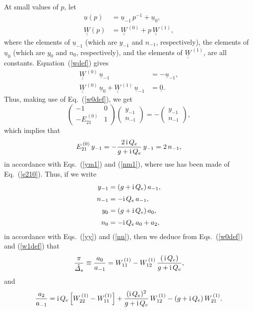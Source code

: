 \documentclass[12pt,prb,aps,notitlepage]{revtex4-1}
\begin{document}
At small values of $p$, let
\begin{align}
\underline{u}(p) &= \underline{u}_{-1}\,p^{-1} + \underline{u}_0,\\[0.5ex]
\underline{\underline{W}}(p) &= \underline{\underline{W}}^{\,(0)} + p\,\underline{\underline{W}}^{\,(1)},
\end{align}
where the elements of  $\underline{u}_{-1}$ (which are $y_{-1}$ and $n_{-1}$, respectively), the elements of $\underline{u}_{0}$ (which are $y_0$ 
and $n_0$, respectively), and the elements of $\underline{\underline{W}}^{\,(1)}$, are all constants.
Equation~(\ref{wdef}) gives 
\begin{align}
\underline{\underline{W}}^{\,(0)}\,\underline{u}_{-1} &= - \underline{u}_{-1},\\[0.5ex]
\underline{\underline{W}}^{\,(0)}\,\underline{u}_{0} + \underline{\underline{W}}^{\,(1)}\,\underline{u}_{-1} &=\underline{0}.\label{w1def}
\end{align}
Thus, making use of Eq.~(\ref{w0def}), we get
\begin{equation}
\left(\begin{array}{cc} -1&0\\ -E_{21}^{\,(0)}&1\end{array}\right) \left(\begin{array}{c}y_{-1}\\ n_{-1}\end{array}\right)= -\left(\begin{array}{c}y_{-1}\\ n_{-1}\end{array}\right),
\end{equation}
which implies that
\begin{equation}
E_{21}^{\,(0)}\,y_{-1}= - \frac{2\,{\rm i}\,Q_e}{g+{\rm i}\,Q_e}\,y_{-1} = 2\,n_{-1},
\end{equation}
in accordance with Eqs.~(\ref{ym1}) and (\ref{nm1}), where use has been made of Eq.~(\ref{e210}). 
Thus, if we write
\begin{align}
y_{-1} &= (g+{\rm i}\,Q_e)\,a_{-1},\\[0.5ex]
n_{-1}&= -{\rm i}\,Q_e\,a_{-1},\\[0.5ex]
y_0 &= (g+{\rm i}\,Q_e)\,a_0,\\[0.5ex]
n_0 &= -{\rm i}\,Q_e\,a_0 + a_2,
\end{align}
in accordance with Eqs.~(\ref{yy}) and (\ref{nn}), then we deduce from Eqs.~(\ref{w0def}) and (\ref{w1def}) that 
\begin{equation}
\frac{\pi}{\hat{\mit\Delta}_s}\equiv \frac{a_0}{a_{-1}} = W_{11}^{\,(1)} - W_{12}^{\,(1)}\,\frac{(\,{\rm i}\,Q_e)}{g+{\rm i}\, Q_e},
\end{equation}
and
\begin{equation} 
\frac{a_2}{a_{-1}} = {\rm i}\,Q_e\left[W_{22}^{\,(1)}-W_{11}^{(1)}\right] + \frac{({\rm i}\,Q_e)^2}{g+{\rm i}\,Q_e}\,W_{12}^{\,(1)} - 
(g+{\rm i}\,Q_e)\,W_{21}^{\,(1)}.
\end{equation}
\end{document}
